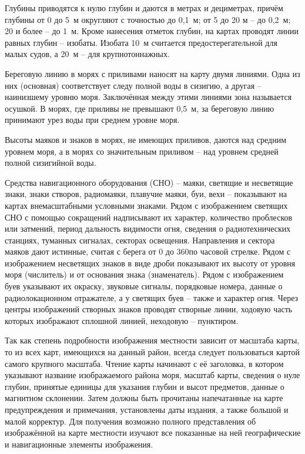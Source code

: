 Глубины приводятся к нулю глубин и даются в метрах и дециметрах,
причём глубины от 0 до 5~м округляют с точностью до 0,1~м; от 5 до 20
м \--- до 0,2~м; 20 и более \--- до 1~м. Кроме нанесения отметок
глубин, на картах проводят линии равных глубин \--- изобаты. Изобата
10~м считается предостерегательной для малых судов, а 20~м \--- для
крупнотоннажных.

Береговую линию в морях с приливами наносят на карту двумя
линиями. Одна из них (основная) соответствует следу полной воды в
сизигию, а другая \--- наинизшему уровню моря. Заключённая между этими
линиями зона называется осушкой. В морях, где приливы не превышают
0,5~м, за береговую линию принимают урез воды при среднем уровне моря.

Высоты маяков и знаков в морях, не имеющих приливов, даются над
средним уровнем моря, а в морях со значительным приливом \--- над
уровнем средней полной сизигийной воды.

Средства навигационного оборудования (СНО) \--- маяки, светящие и
несветящие знаки, знаки створов, радиомаяки, плавучие маяки, буи, вехи
\--- показывают на картах внемасштабными условными знаками. Рядом с
изображением светящих СНО с помощью сокращений надписывают их
характер, количество проблесков или затмений, период дальность
видимости огня, сведения о радиотехнических станциях, туманных
сигналах, секторах освещения. Направления и сектора маяков дают
истинные, считая с берега от 0 до 360\gr по часовой стрелке. Рядом с
изображением несветящих знаков в виде дроби показывают их высоту от
уровня моря (числитель) и от основания знака (знаменатель). Рядом с
изображением буев указывают их окраску, звуковые сигналы, порядковые
номера, данные о радиолокационном отражателе, а у светящих буев \---
также и характер огня. Через центры изображений створных знаков
проводят створные линии, ходовую часть которых изображают сплошной
линией, неходовую \--- пунктиром.

Так как степень подробности изображения местности зависит от масштаба
карты, то из всех карт, имеющихся на данный район, всегда следует
пользоваться картой самого крупного масштаба. Чтение карты начинают с
её заголовка, в котором указывают название изображаемого района моря,
масштаб карты, сведения о нуле глубин, принятые единицы для указания
глубин и высот предметов, данные о магнитном склонении. Затем должны
быть прочитаны напечатанные на карте предупреждения и примечания,
установлены даты издания, а также большой и малой корректур. Для
получения возможно полного представления об изображённой на карте
местности изучают все показанные на ней географические и навигационные
элементы изображения.


